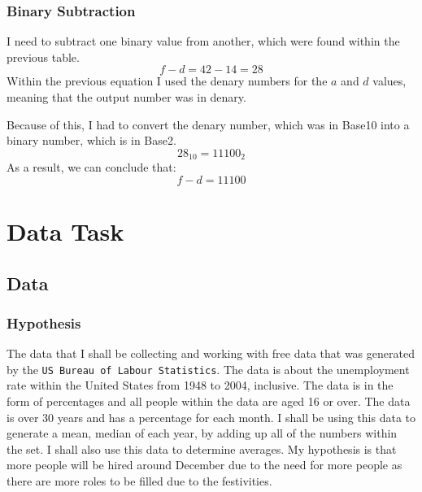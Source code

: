 \documentclass[a4paper,12pt]{article}
\begin{document}
\subsubsection{Binary Subtraction}
I need to subtract one binary value from another, which were found within the previous table.
\[
  f - d = 42 - 14 = 28
\]
Within the previous equation I used the denary numbers for the $a$ and $d$ values, meaning that the output number was in denary.

Because of this, I had to convert the denary number, which was in Base10 into a binary number, which is in Base2.
\[
  28_{10} = 11100_{2}
\]
As a result, we can conclude that:
\[
  f - d = 11100
\]

\newpage

\section{Data Task}
\subsection{Data}
\subsubsection{Hypothesis}
The data that I shall be collecting and working with free data that was generated by the \texttt{US Bureau of Labour Statistics}. The data is about the unemployment rate within the United States from 1948 to 2004, inclusive. The data is in the form of percentages and all people within the data are aged 16 or over.
The data is over 30 years and has a percentage for each month. I shall be using this data to generate a mean, median of each year, by adding up all of the numbers within the set. I shall also use this data to determine averages.
My hypothesis is that more people will be hired around December due to the need for more people as there are more roles to be filled due to the festivities.
\end{document}
